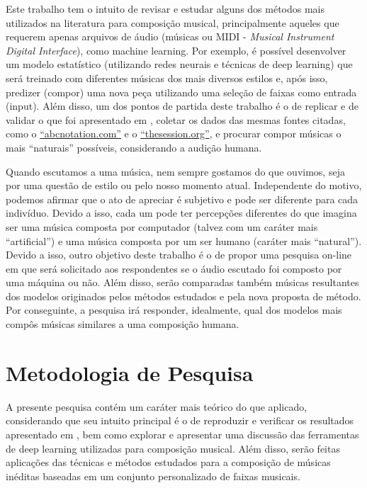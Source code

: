 \documentclass{automatextcc}
\begin{document}
Este trabalho tem o intuito de revisar e estudar alguns dos métodos mais utilizados na literatura para composição musical, principalmente aqueles que requerem apenas arquivos de áudio (músicas ou MIDI - \textit{Musical Instrument Digital Interface}), como machine learning. Por exemplo, é possível desenvolver um modelo estatístico (utilizando redes neurais e técnicas de deep learning) que será treinado com diferentes músicas dos mais diversos estilos e, após isso, predizer (compor) uma nova peça utilizando uma seleção de faixas como entrada (input). Além disso, um dos pontos de partida deste trabalho é o de replicar e de validar o que foi apresentado em \cite{agarwala2017music}, coletar os dados das mesmas fontes citadas, como o \href{https://abcnotation.com/}{``abcnotation.com''} e o \href{https://thesession.org/}{``thesession.org''}, e procurar compor músicas o mais ``naturais'' possíveis, considerando a audição humana. 

Quando escutamos a uma música, nem sempre gostamos do que ouvimos, seja por uma questão de estilo ou pelo nosso momento atual. Independente do motivo, podemos afirmar que o ato de apreciar é subjetivo e pode ser diferente para cada indivíduo. Devido a isso, cada um pode ter percepções diferentes do que imagina ser uma música composta por computador (talvez com um caráter mais ``artificial'') e uma música composta por um ser humano (caráter mais ``natural''). Devido a isso, outro objetivo deste trabalho é o de propor uma pesquisa on-line em que será solicitado aos respondentes se o áudio escutado foi composto por uma máquina ou não. Além disso, serão comparadas também músicas resultantes dos modelos originados pelos métodos estudados e pela nova proposta de método. Por conseguinte, a pesquisa irá responder, idealmente, qual dos modelos mais compôs músicas similares a uma composição humana.



\newpage
\section{Metodologia de Pesquisa}

A presente pesquisa contém um caráter mais teórico do que aplicado, considerando que seu intuito principal é o de reproduzir e verificar os resultados apresentado em \cite{agarwala2017music}, bem como explorar e apresentar uma discussão das ferramentas de deep learning utilizadas para composição musical. Além disso, serão feitas aplicações das técnicas e métodos estudados para a composição de músicas inéditas baseadas em um conjunto personalizado de faixas musicais.
\end{document}
